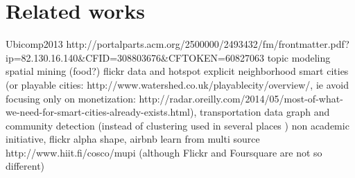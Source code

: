\chapter{Related works}
\label{chap:related}

Ubicomp2013 http://portalparts.acm.org/2500000/2493432/fm/frontmatter.pdf?ip=82.130.16.140&CFID=308803676&CFTOKEN=60827063
topic modeling
spatial mining (food?)
flickr data and hotspot
explicit neighborhood
smart cities \autocite{Eunoia13} (or playable cities:
http://www.watershed.co.uk/playablecity/overview/, ie avoid focusing only on
monetization:
http://radar.oreilly.com/2014/05/most-of-what-we-need-for-smart-cities-already-exists.html),
transportation data
graph and community detection (instead of clustering used in several places
\autocite{PositinalCluster14})
non academic initiative, flickr alpha shape, airbnb
learn from multi source http://www.hiit.fi/cosco/mupi (although Flickr and
Foursquare are not so different)
